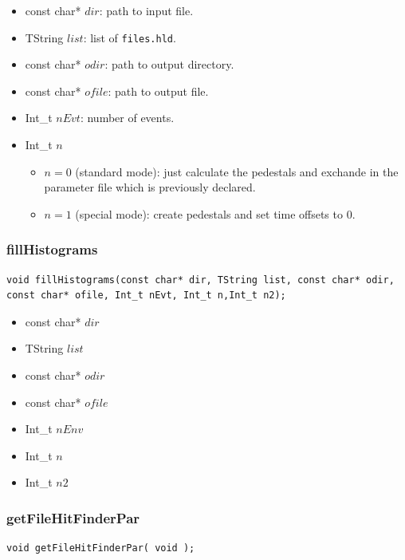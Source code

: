 \documentclass[a4paper]{book}
\begin{document}
\begin{itemize}
	\item const char* $dir$: path to input file.
	\item TString $list$: list of \texttt{files.hld}.
	\item const char* $odir$: path to output directory.
	\item const char* $ofile$: path to output file.
	\item Int\_t $nEvt$: number of events.
	\item Int\_t $n$
	\begin{itemize}
		\item $n = 0$ (standard mode): just calculate the pedestals and exchande in the parameter file which is previously declared.
		\item $n = 1$ (special mode):  create pedestals and set time offsets to 0.
	\end{itemize}
\end{itemize}


\subsubsection{fillHistograms}

\begin{lstlisting}[style=customc]
void fillHistograms(const char* dir, TString list, const char* odir, const char* ofile, Int_t nEvt, Int_t n,Int_t n2);
\end{lstlisting}

\begin{itemize}
	\item const char* $dir$
	\item TString $list$
	\item const char* $odir$
	\item const char* $ofile$
	\item Int\_t $nEnv$
	\item Int\_t $n$
	\item Int\_t $n2$
	
\end{itemize}

\subsubsection{getFileHitFinderPar}

\begin{lstlisting}[style=customc]
void getFileHitFinderPar( void );
\end{lstlisting}
\end{document}
